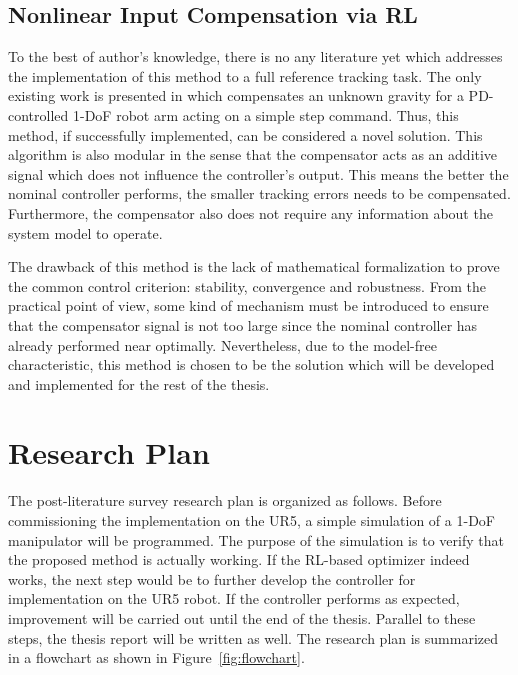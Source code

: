 \subsection{Nonlinear Input Compensation via \ac{RL}}
To the best of author's knowledge, there is no any literature yet which addresses the implementation of this method to a full reference tracking task. The only existing work is presented in \cite{Efe2014} which compensates an unknown gravity for a \ac {PD}-controlled 1-\ac {DoF} robot arm acting on a simple step command. Thus, this method, if successfully implemented, can be considered a novel solution. This algorithm is also modular in the sense that the compensator acts as an additive signal which does not influence the controller's output. This means the better the nominal controller performs, the smaller tracking errors needs to be compensated. Furthermore, the compensator also does not require any information about the system model to operate. 

The drawback of this method is the lack of mathematical formalization to prove the common control criterion: stability, convergence and robustness. From the practical point of view, some kind of mechanism must be introduced to ensure that the compensator signal is not too large since the nominal controller has already performed near optimally. Nevertheless, due to the model-free characteristic, this method is chosen to be the solution which will be developed and implemented for the rest of the thesis.

\section{Research Plan} \label{sec:res_planning}
The post-literature survey research plan is organized as follows. Before commissioning the implementation on the UR5, a simple simulation of a 1-\ac {DoF} manipulator will be programmed. The purpose of the simulation is to verify that the proposed method is actually working. If the \ac{RL}-based optimizer indeed works, the next step would be to further develop the controller for implementation on the UR5 robot. If the controller performs as expected, improvement will be carried out until the end of the thesis. Parallel to these steps, the thesis report will be written as well. The research plan is summarized in a flowchart as shown in Figure~\ref{fig:flowchart}.

